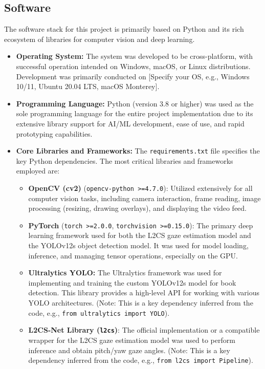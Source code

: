 \subsection{Software}
The software stack for this project is primarily based on Python and its rich ecosystem of libraries for computer vision and deep learning.
\begin{itemize}
    \item \textbf{Operating System:} The system was developed to be cross-platform, with successful operation intended on Windows, macOS, or Linux distributions. Development was primarily conducted on [Specify your OS, e.g., Windows 10/11, Ubuntu 20.04 LTS, macOS Monterey].
    \item \textbf{Programming Language:} Python (version 3.8 or higher) was used as the sole programming language for the entire project implementation due to its extensive library support for AI/ML development, ease of use, and rapid prototyping capabilities.
    \item \textbf{Core Libraries and Frameworks:} The \texttt{requirements.txt} file specifies the key Python dependencies. The most critical libraries and frameworks employed are:
    \begin{itemize}
        \item \textbf{OpenCV (cv2)} (\texttt{opencv-python >=4.7.0}): Utilized extensively for all computer vision tasks, including camera interaction, frame reading, image processing (resizing, drawing overlays), and displaying the video feed.
        \item \textbf{PyTorch} (\texttt{torch >=2.0.0}, \texttt{torchvision >=0.15.0}): The primary deep learning framework used for both the L2CS gaze estimation model and the YOLOv12s object detection model. It was used for model loading, inference, and managing tensor operations, especially on the GPU.
        \item \textbf{Ultralytics YOLO:} The Ultralytics framework was used for implementing and training the custom YOLOv12s model for book detection. This library provides a high-level API for working with various YOLO architectures. (Note: This is a key dependency inferred from the code, e.g., \texttt{from ultralytics import YOLO}).
        \item \textbf{L2CS-Net Library (\texttt{l2cs})}: The official implementation or a compatible wrapper for the L2CS gaze estimation model was used to perform inference and obtain pitch/yaw gaze angles. (Note: This is a key dependency inferred from the code, e.g., \texttt{from l2cs import Pipeline}).

\end{itemize}
\end{itemize}
